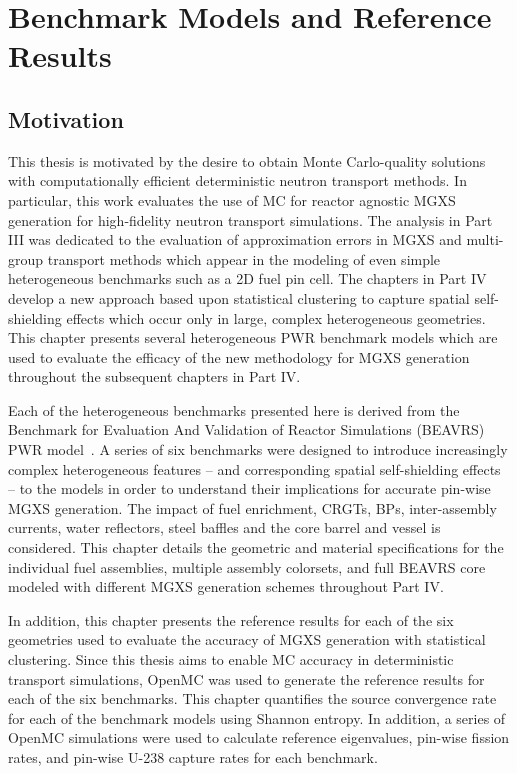 \chapter{Benchmark Models and Reference Results}
\label{chap:benchmarks}

\section{Motivation}
\label{sec:chap7-motivate}

This thesis is motivated by the desire to obtain Monte Carlo-quality solutions with computationally efficient deterministic neutron transport methods. In particular, this work evaluates the use of \ac{MC} for reactor agnostic \ac{MGXS} generation for high-fidelity neutron transport simulations. The analysis in Part III was dedicated to the evaluation of approximation errors in \ac{MGXS} and multi-group transport methods which appear in the modeling of even simple heterogeneous benchmarks such as a 2D fuel pin cell. The chapters in Part IV develop a new approach based upon statistical clustering to capture spatial self-shielding effects which occur only in large, complex heterogeneous geometries. This chapter presents several heterogeneous \ac{PWR} benchmark models which are used to evaluate the efficacy of the new methodology for \ac{MGXS} generation throughout the subsequent chapters in Part IV.

Each of the heterogeneous benchmarks presented here is derived from the Benchmark for Evaluation And Validation of Reactor Simulations (BEAVRS) \ac{PWR} model~\cite{horelik2013beavrs}. A series of six benchmarks were designed to introduce increasingly complex heterogeneous features -- and corresponding spatial self-shielding effects -- to the models in order to understand their implications for accurate pin-wise \ac{MGXS} generation. The impact of fuel enrichment, \acp{CRGT}, \acp{BP}, inter-assembly currents, water reflectors, steel baffles and the core barrel and vessel is considered. This chapter details the geometric and material specifications for the individual fuel assemblies, multiple assembly colorsets, and full \ac{BEAVRS} core modeled with different \ac{MGXS} generation schemes throughout Part IV.

In addition, this chapter presents the reference results for each of the six geometries used to evaluate the accuracy of \ac{MGXS} generation with statistical clustering. Since this thesis aims to enable \ac{MC} accuracy in deterministic transport simulations, OpenMC was used to generate the reference results for each of the six benchmarks. This chapter quantifies the source convergence rate for each of the benchmark models using Shannon entropy. In addition, a series of OpenMC simulations were used to calculate reference eigenvalues, pin-wise fission rates, and pin-wise U-238 capture rates for each benchmark.

